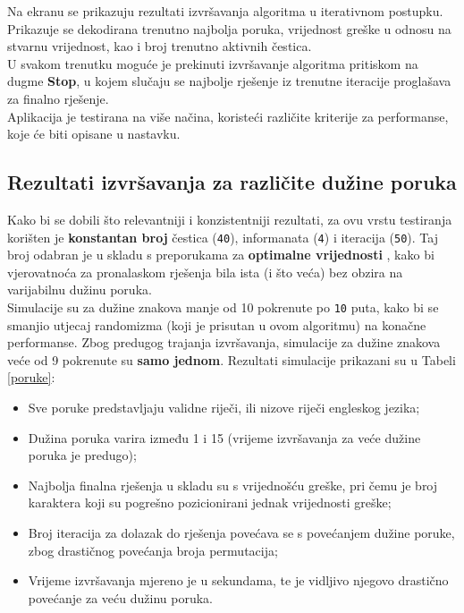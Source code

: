\documentclass[12pt, a4paper]{article}
\begin{document}
Na ekranu se prikazuju rezultati izvršavanja algoritma u iterativnom postupku. Prikazuje se dekodirana trenutno najbolja poruka, vrijednost greške u odnosu na stvarnu vrijednost, kao i broj trenutno aktivnih čestica. \\

U svakom trenutku moguće je prekinuti izvršavanje algoritma pritiskom na dugme \textbf{Stop}, u kojem slučaju se najbolje rješenje iz trenutne iteracije proglašava za finalno rješenje. \\

Aplikacija je testirana na više načina, koristeći različite kriterije za performanse, koje će biti opisane u nastavku.

\subsection{Rezultati izvršavanja za različite dužine poruka}

Kako bi se dobili što relevantniji i konzistentniji rezultati, za ovu vrstu testiranja korišten je \textbf{konstantan broj} čestica (\texttt{40}), informanata (\texttt{4}) i iteracija (\texttt{50}). Taj broj odabran je u skladu s preporukama za \textbf{optimalne vrijednosti} \cite{samke}, kako bi vjerovatnoća za pronalaskom rješenja bila ista (i što veća) bez obzira na varijabilnu dužinu poruka. \\

Simulacije su za dužine znakova manje od 10 pokrenute po \texttt{10} puta, kako bi se smanjio utjecaj randomizma (koji je prisutan u ovom algoritmu) na konačne performanse. Zbog predugog trajanja izvršavanja, simulacije za dužine znakova veće od 9 pokrenute su \textbf{samo jednom}. Rezultati simulacije prikazani su u Tabeli \ref{poruke}:

\begin{itemize}
\renewcommand\labelitemi{--}

\item Sve poruke predstavljaju validne riječi, ili nizove riječi engleskog jezika;
\item Dužina poruka varira između 1 i 15 (vrijeme izvršavanja za veće dužine poruka je predugo);
\item Najbolja finalna rješenja u skladu su s vrijednošću greške, pri čemu je broj karaktera koji su pogrešno pozicionirani jednak vrijednosti greške;
\item Broj iteracija za dolazak do rješenja povećava se s povećanjem dužine poruke, zbog drastičnog povećanja broja permutacija;
\item Vrijeme izvršavanja mjereno je u sekundama, te je vidljivo njegovo drastično povećanje za veću dužinu poruka.

\end{itemize}
\end{document}
